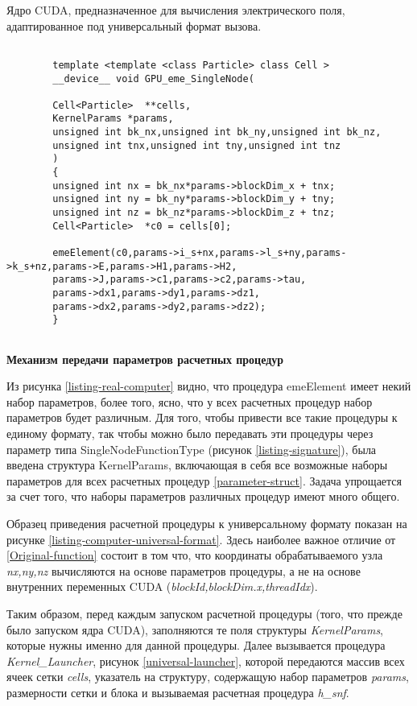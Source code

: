 \begin{ListingEnv}[!h]
	\captiondelim{ } %
	\caption{Ядро CUDA, предназначенное для вычисления электрического поля, адаптированное под универсальный формат вызова.}
	\label{parameter-struct1}	
	\begin{lstlisting}[language={[ISO]C++}]
	
		template <template <class Particle> class Cell >
		__device__ void GPU_eme_SingleNode(
		
		Cell<Particle>  **cells,
		KernelParams *params,
		unsigned int bk_nx,unsigned int bk_ny,unsigned int bk_nz,
		unsigned int tnx,unsigned int tny,unsigned int tnz
		)
		{
		unsigned int nx = bk_nx*params->blockDim_x + tnx;
		unsigned int ny = bk_ny*params->blockDim_y + tny;
		unsigned int nz = bk_nz*params->blockDim_z + tnz;
		Cell<Particle>  *c0 = cells[0];
		
		emeElement(c0,params->i_s+nx,params->l_s+ny,params->k_s+nz,params->E,params->H1,params->H2,
		params->J,params->c1,params->c2,params->tau,
		params->dx1,params->dy1,params->dz1,
		params->dx2,params->dy2,params->dz2);
		}
	
	\end{lstlisting}
\end{ListingEnv}

\textbf{Механизм передачи параметров расчетных процедур}


Из рисунка \ref{listing-real-computer} видно, что процедура emeElement имеет некий набор параметров, более того, ясно, что у всех расчетных процедур набор параметров будет различным. Для
того, чтобы привести все такие процедуры к единому формату, так чтобы можно было передавать эти процедуры через параметр типа SingleNodeFunctionType (рисунок \ref{listing-signature}), была введена структура KernelParams, включающая в себя все возможные наборы параметров для всех расчетных процедур \ref{parameter-struct}. Задача упрощается за счет того, что наборы параметров различных процедур имеют много общего. 

Образец приведения расчетной процедуры к универсальному формату показан на рисунке \ref{listing-computer-universal-format}. Здесь наиболее важное отличие от \ref{Original-function} состоит в том что, что координаты обрабатываемого узла \textit{nx,ny,nz} вычисляются на основе параметров процедуры, а не на основе внутренних переменных CUDA (\textit{blockId,blockDim.x,threadIdx}).

Таким образом, перед каждым запуском расчетной процедуры (того, что прежде было запуском ядра CUDA), заполняются те поля структуры \textit{KernelParams}, которые нужны именно для данной процедуры.
Далее вызывается процедура \textit{Kernel\_Launcher}, рисунок \ref{universal-launcher}, которой передаются массив всех ячеек сетки \textit{cells}, указатель на структуру, содержащую набор параметров \textit{params}, размерности сетки и блока  и вызываемая расчетная процедура \textit{h\_snf}.

